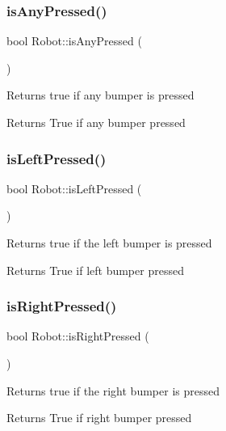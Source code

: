 \subsubsection{\texorpdfstring{is\+Any\+Pressed()}{isAnyPressed()}}
{\footnotesize\ttfamily bool Robot\+::is\+Any\+Pressed (\begin{DoxyParamCaption}{ }\end{DoxyParamCaption})}

Returns true if any bumper is pressed \begin{DoxyReturn}{Returns}
True if any bumper pressed 
\end{DoxyReturn}
\mbox{\label{classRobot_a3b33d92fbb96a9dc1c1eb7e2b776be38}} 
\subsubsection{\texorpdfstring{is\+Left\+Pressed()}{isLeftPressed()}}
{\footnotesize\ttfamily bool Robot\+::is\+Left\+Pressed (\begin{DoxyParamCaption}{ }\end{DoxyParamCaption})}

Returns true if the left bumper is pressed \begin{DoxyReturn}{Returns}
True if left bumper pressed 
\end{DoxyReturn}
\mbox{\label{classRobot_acb4caaf0af89fd69fcc0396e79690a39}} 
\subsubsection{\texorpdfstring{is\+Right\+Pressed()}{isRightPressed()}}
{\footnotesize\ttfamily bool Robot\+::is\+Right\+Pressed (\begin{DoxyParamCaption}{ }\end{DoxyParamCaption})}

Returns true if the right bumper is pressed \begin{DoxyReturn}{Returns}
True if right bumper pressed 
\end{DoxyReturn}
\mbox{\label{classRobot_aa4b3f22bf6f084baaa9a2e2a8b0e491d}} 
